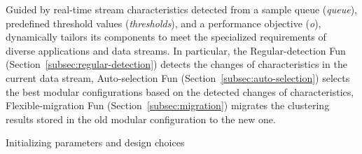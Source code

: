 Guided by real-time stream characteristics detected from a sample queue (\textit{queue}), predefined threshold values (\textit{thresholds}), and a performance objective (\textit{o}), \algo dynamically tailors its components to meet the specialized requirements of diverse applications and data streams. In particular, the Regular-detection Fun (Section~\ref{subsec:regular-detection}) detects the changes of characteristics in the current data stream, Auto-selection Fun (Section~\ref{subsec:auto-selection}) selects the best modular configurations based on the detected changes of characteristics, Flexible-migration Fun (Section~\ref{subsec:migration}) migrates the clustering results stored in the old modular configuration to the new one. 

\begin{algorithm}[t]
\scriptsize
\caption{Execution flow of \algo.}
\label{alg:algo}
    Initializing parameters and design choices \;
\end{algorithm}

